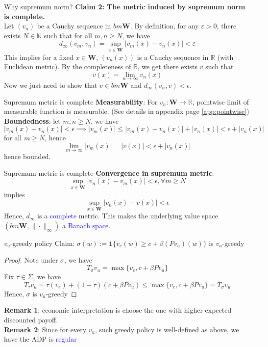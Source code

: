 \documentclass[aspectratio=169]{beamer} %
\begin{document}
\begin{frame}{Why supremum norm?}
\textbf{Claim 2: The metric induced by supremum norm is complete.}\\
Let $(v_n)$ be a Cauchy sequence in $bm\mathbf{W}$. By definition, for any $\varepsilon>0$, there exists $N\in \mathbb{N}$ such that for all $m,n\ge N$, we have
$$
d_\infty (v_m,v_n) = \sup_{x\in \mathbf{W}}|v_m(x)-v_n(x)|<\varepsilon
$$
This implies for a fixed $x\in \mathbf{W}$, $(v_n(x))$ is a Cauchy sequence in $\mathbb{R}$ (with Euclidean metric). By the completeness of $\mathbb{R}$, we get there exists $v$ such that
$$
v(x) = \lim_{n\to\infty }v_n(x)
$$
Now we just need to show that $v\in bm\mathbf{W}$ and $d_\infty(v_n,v)<\epsilon$.
\end{frame}
\begin{frame}{Supremum metric is complete}
\textbf{Measurability}: For $v_n:\mathbf{W}\to\mathbb{R}$, pointwise limit of measurable function is measurable. (See details in appendix page \ref{app:pointwise})\\
\textbf{Boundedness}: let $m,n\ge N$, we have
$$
|v_m(x) - v_n(x)|<\epsilon \implies |v_m(x)|\le |v_m(x)-v_n(x)|+|v_n(x)|<\epsilon + |v_n(x)|
$$
for all $m\ge N$, hence
$$
\lim_{m\to\infty}|v_m(x)| = |v(x)|<\epsilon +|v_n(x)|
$$
hence bounded.
\end{frame}
\begin{frame}{Supremum metric is complete}
    \textbf{Convergence in supremum metric}:
    $$
    \sup_{x\in \mathbf{W}}|v_n(x)-v_m(x)|<\epsilon,\forall m\ge N
    $$
    implies
    $$
    \sup_{x\in \mathbf{W}} |v_n(x)-v(x)| <\epsilon 
    $$
    Hence, $d_\infty$ is a \textcolor{blue}{complete} metric. This makes the underlying value space $(bm\mathbf{W},\|\cdot\|_\infty)$ a \textcolor{blue}{Banach space}.
\end{frame}
\begin{frame}{$v_u$-greedy policy}
    Claim: $\sigma(w):= \mathbf{1}\{v_e(w)\ge c+\beta (Pv_u)(w)\}$ is $v_u$-greedy
    \begin{proof}
    Note under $\sigma$, we have
    $$
    T_\sigma v_u = \max\{v_e , c+\beta Pv_u\}
    $$
        Fix $\tau\in \Sigma$, we have
        $$
        T_\tau v_u = \tau(v_e) + (1-\tau)(c+\beta Pv_u) \le \max\{v_e, c+\beta Pv_u\} = T_\sigma v_u
        $$
    Hence, $\sigma$ is $v_u$-greedy
    \end{proof}
    \textbf{Remark 1}: economic interpretation is choose the one with higher expected discounted payoff.\\
    \textbf{Remark 2}: Since for every $v_u$, such greedy policy is well-defined as above, we have the ADP is \textcolor{blue}{regular}
\end{frame}
\end{document}
